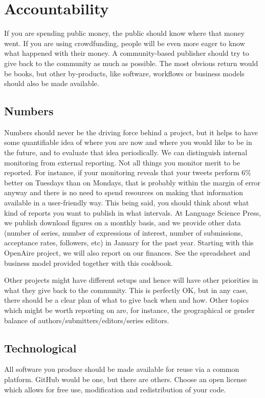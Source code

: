 \documentclass[nonflat,smallfont
]{langsci/langscibook}
\begin{document}
            
\section{Accountability}\label{sec:accountability}
If you are spending public money, the public should know where that money went. If you are using crowdfunding, people will be even more eager to know what happened with their money. A community-based publisher should try to give back to the community as much as possible. The most obvious return would be books, but other by-products, like software, workflows or business models should also be made available. 

\subsection{Numbers}
Numbers should never be the driving force behind a project, but it helps to have some quantifiable idea of where you are now and where you would like to be in the future, and to evaluate that idea periodically. We can distinguish internal monitoring from external reporting. Not all things you monitor merit to be reported. For instance, if your monitoring reveals that your tweets perform 6\% better on Tuesdays than on Mondays, that is probably within the margin of error anyway and there is no need to spend resources on making that information available in a user-friendly way. This being said, you should think about what kind of reports you want to publish in what intervals. At Language Science Press, we publish download figures on a monthly basis, and we provide other data (number of series, number of expressions of interest, number of submissions, acceptance rates, followers, etc) in January for the past year. Starting with this Open\-Aire project, we will also report on our finances. See the spreadsheet and business model provided together with this cookbook.

Other projects might have different setups and hence will have other priorities in what they give back to the community. This is perfectly OK, but in any case, there should be a clear plan of what to give back when and how. Other topics which might be worth reporting on are, for instance, the geographical or gender balance of authors/submitters/editors/series editors.


\subsection{Technological}
All software you produce should be made available for reuse via a common platform. GitHub would be one, but there are others. Choose an open license which allows for free use, modification and redistribution of your code. 
\end{document}
